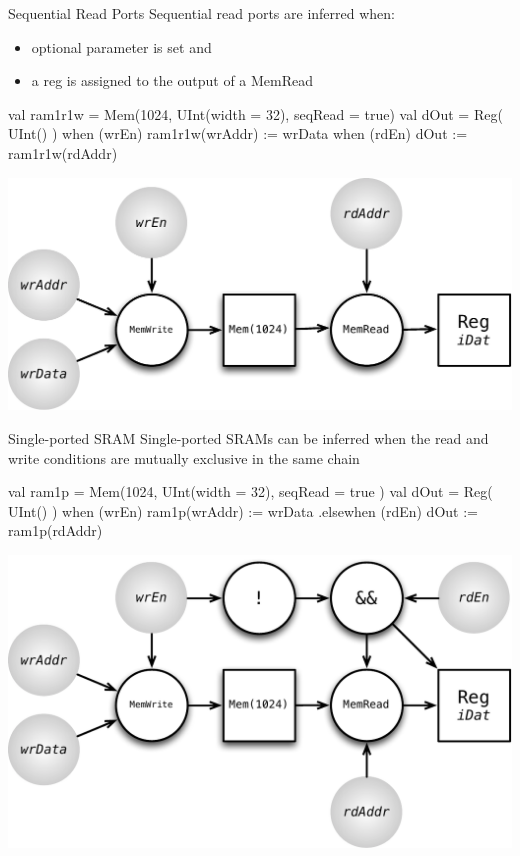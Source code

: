 \documentclass[xcolor=pdflatex,dvipsnames,table]{beamer}
\begin{document}
\begin{frame}[fragile]{Sequential Read Ports}
Sequential read ports are inferred when:
\begin{itemize}
\item optional parameter  is set and
\item a reg is assigned to the output of a MemRead
\end{itemize}

\begin{scala}
val ram1r1w = Mem(1024, UInt(width = 32), seqRead = true)
val dOut    = Reg( UInt() )
when (wrEn) { ram1r1w(wrAddr) := wrData }
when (rdEn) { dOut := ram1r1w(rdAddr) }
\end{scala}

\begin{center}
\includegraphics[height=0.4\textheight]{figs/mem-seq-read.pdf} 
\end{center}

\end{frame}

\begin{frame}[fragile]{Single-ported SRAM}
Single-ported SRAMs can be inferred when the read and write conditions are
mutually exclusive in the same  chain

\begin{scala}
val ram1p = Mem(1024, UInt(width = 32), seqRead = true )
val dOut  = Reg( UInt() )
when (wrEn) { ram1p(wrAddr) := wrData }
.elsewhen (rdEn) { dOut := ram1p(rdAddr) }
\end{scala}

\begin{center}
\includegraphics[height=0.5\textheight]{figs/mem-single-ported.pdf} 
\end{center}

\end{frame}
\end{document}
